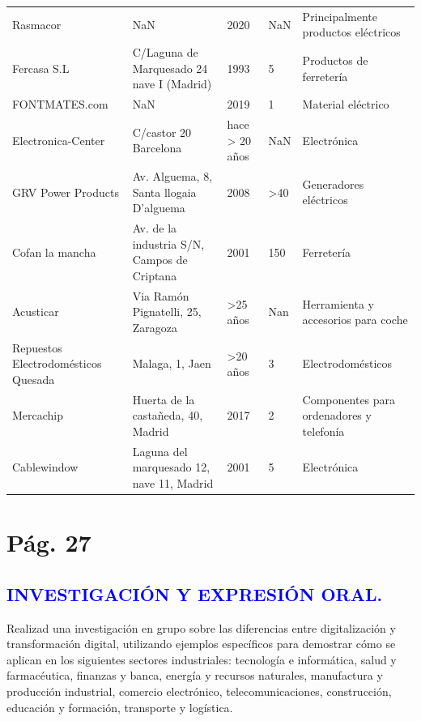 \documentclass[spanish,openany]{report}
\begin{document}
\begin{tabularx}{\linewidth}{|C{3cm}|Y|Y|Y|Y|}
\hline
{} &  &  &  &  \\
\hline
	Rasmacor & NaN & 2020 & NaN  &  Principalmente productos eléctricos\\
\hline
	Fercasa S.L & C/Laguna de Marquesado 24 nave I (Madrid) & 1993 & 5 & Productos de ferretería \\
\hline
	FONTMATES.com & NaN & 2019 & 1 &  Material eléctrico\\
\hline
	Electronica-Center &  C/castor 20  Barcelona & hace > 20 años & NaN & Electrónica \\
\hline
	GRV Power Products & Av. Alguema, 8, Santa llogaia D'alguema & 2008 & >40 & Generadores eléctricos \\
\hline
	Cofan la mancha & Av. de la industria S/N, Campos de Criptana  & 2001 & 150 & Ferretería \\
\hline
	Acusticar & Via Ramón Pignatelli, 25, Zaragoza  & >25 años  & Nan  & Herramienta y accesorios para coche\\
\hline
	Repuestos Electrodomésticos Quesada & Malaga, 1, Jaen & >20 años & 3 &  Electrodomésticos \\
\hline
	Mercachip & Huerta de la castañeda, 40, Madrid & 2017  & 2 &  Componentes para ordenadores y telefonía \\
\hline
	Cablewindow & Laguna del marquesado 12, nave 11, Madrid  & 2001 & 5 & Electrónica \\
\hline
\end{tabularx}
\clearpage

\section{Pág. 27}
\subsection{\textcolor{blue}{INVESTIGACIÓN Y EXPRESIÓN ORAL.}}\begin{Large}
 Realizad una investigación en grupo sobre las diferencias entre digitalización y transformación digital, utilizando ejemplos específicos para demostrar cómo se aplican en los siguientes sectores industriales: tecnología e informática, salud y farmacéutica, finanzas y banca, energía y recursos naturales, manufactura y producción industrial, comercio electrónico, telecomunicaciones, construcción, educación y formación, transporte y logística.
\end{Large}
\end{document}
